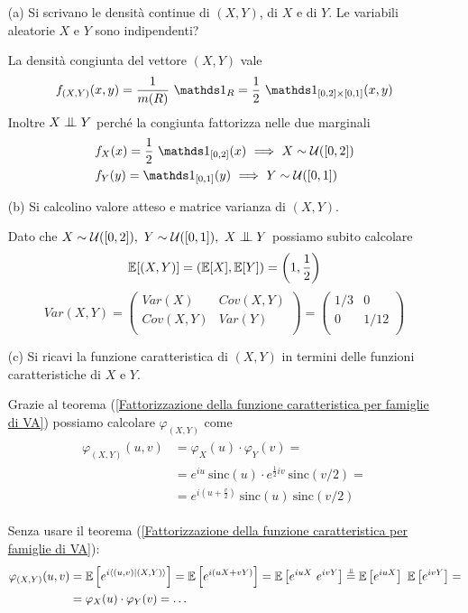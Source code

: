\Soluzione{} %
\begin{itemize}
\item [(a)] Si scrivano le densità continue di $(X,Y)$, di $X$ e di $Y$. Le variabili aleatorie $X$ e $Y$ sono indipendenti?

La densità congiunta del vettore $(X,Y)$ vale
\[
\fXYxy=\frac{1}{m(R)}\ \Ind_R=\frac{1}{2}\ \Ind_{[0,2]\times [0,1]}(x,y)
\]
Inoltre $X\indep Y$ perché la congiunta fattorizza nelle due marginali
\begin{gather*}
\begin{aligned}
&f_X(x)=\frac{1}{2}\ \Ind_{[0,2]}(x)\SE X\sim\UUU([0,2])\\
&f_Y(y)=\Ind_{[0,1]}(y)\SE Y\sim\UUU([0,1])
\end{aligned}
\end{gather*}

\item [(b)] Si calcolino valore atteso e matrice varianza di $(X,Y)$.

Dato che $X\sim\UUU([0,2]),\ Y\sim\UUU([0,1]),\ X\indep Y$ possiamo subito calcolare
\[
\mathbb{E}[(X,Y)]=\left(\mathbb{E}[X],\mathbb{E}[Y]\right)=\left(1,\frac{1}{2}\right)
\]
\[
Var(X,Y)=\begin{pmatrix}
Var(X) & Cov(X,Y) \\
Cov(X,Y) & Var(Y) \\
\end{pmatrix}=\begin{pmatrix}
1/3 & 0 \\
0 & 1/12 \\
\end{pmatrix}
\]

\item [(c)] Si ricavi la funzione caratteristica di $(X,Y)$ in termini delle funzioni caratteristiche di $X$ e $Y$.

Grazie al teorema (\ref{Fattorizzazione della funzione caratteristica per famiglie di VA}) possiamo calcolare $\varphi_{(X,Y)}$ come
\begin{gather*}
\begin{aligned}
\varphi_{(X,Y)}(u,v)&=\varphi_X(u)\cdot \varphi_Y(v)=\\
&=e^{iu}\ \text{sinc}(u)\cdot e^{\frac{1}{2}iv}\ \text{sinc}\left(v/2\right)=\\
&=e^{i\left(u+\frac{v}{2}  \right)}\ \text{sinc}(u)\ \text{sinc}\left(v/2\right)
\end{aligned}
\end{gather*}

\begin{oss}
Senza usare il teorema (\ref{Fattorizzazione della funzione caratteristica per famiglie di VA}):
\begin{gather*}
\begin{aligned}
\varphi_{(X,Y)}(u,v)&=\EE\left[e^{i\langle(u,v)|(X,Y)  \rangle}   \right]=\EE\left[e^{i(uX+vY)}   \right]=\EE\left[e^{iuX}\ e^{ivY}   \right]\overset{\underset{\indep}{}}{=}\EE\left[e^{iuX}\right]\ \EE\left[e^{ivY}\right]=\\
&=\varphi_X(u)\cdot \varphi_Y(v)=\dots
\end{aligned}
\end{gather*}
\end{oss}


\end{itemize}
